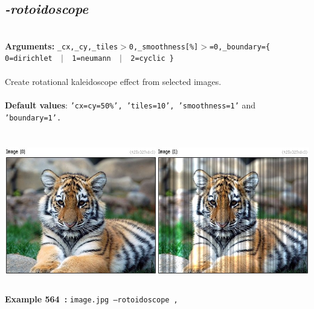 \documentclass[a4paper,11pt,twoside]{book}
\begin{document}
\subsection{\emph{-rotoidoscope} }\vspace*{-0.5em}
~\\\textbf{Arguments: } 
{\small \texttt{\_cx,\_cy,\_tiles$>$0,\_smoothness[\%]$>$=0,\_boundary=\{ 0=dirichlet ~$|$~ 1=neumann ~$|$~ 2=cyclic \}}}\\~\\
Create rotational kaleidoscope effect from selected images.
~\\~\\\textbf{Default values}: {\small \texttt{'cx=cy=50\%', 'tiles=10', 'smoothness=1'} and \texttt{'boundary=1'.}}
\begin{center}\includegraphics[keepaspectratio=true,height=7cm,width=\textwidth]{img/gmic_def564.jpg}\\
{\footnotesize \textbf{Example 564~:} \texttt{image.jpg --rotoidoscope ,}}
\end{center}
\end{document}
